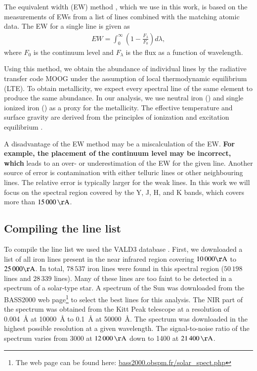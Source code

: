 \documentclass{aa}
\begin{document}
The equivalent width (EW) method
\citep[see e.g.][]{Sousa2008a,Mucciarelli2013,Bensby2014}, which we use
in this work, is based on the measurements of EWs from a list of lines
combined with the matching atomic data. The EW for a single line is
given as
\begin{align}
    \label{eq:EW}
    EW = \int_0^\infty \left(1 - \frac{F_\lambda}{F_0}\right) d\lambda,
\end{align}
where $F_0$ is the continuum level and $F_\lambda$ is the flux as a
function of wavelength.

Using this method, we obtain the abundance of individual lines by
the radiative transfer code MOOG \citep[][version 2013]{Sneden1973}
under the assumption of local thermodynamic equilibrium (LTE). To
obtain metallicity, we expect every spectral line of the same element
to produce the same abundance. In our analysis, we use neutral iron
() and single ionized iron () as a proxy for
the metallicity. The effective temperature and surface gravity are
derived from the principles of ionization and excitation equilibrium
\citep[see][]{Gray2006}.


A disadvantage of the EW method may be a miscalculation of the EW. \textbf{For
example, the placement of the continuum level may be incorrect, which}
leads to an over- or underestimation of the EW for the given line.
Another source of error is contamination with either telluric lines or
other neighbouring lines. The relative error is typically larger for the
weak lines. In this work we will focus on the spectral region covered by
the Y, J, H, and K bands, which covers more than $\SI{15000}{\AA}$.



\subsection{Compiling the line list}

To compile the line list we used the VALD3 database \citep{VALD1,VALD2}.
First, we downloaded a list of all iron lines present in the near
infrared region covering $10\,000\si{\AA}$ to $25\,000\si{\AA}$.
In total, $78\,537$ iron lines were found in this spectral region
($50\,198$  lines and $28\,339$  lines).
Many of these lines are too faint to be detected in a spectrum
of a solar-type star. A spectrum of the Sun was downloaded from
the BASS2000 web page\footnote{The web page can be found here:
\url{bass2000.obspm.fr/solar_spect.php}} to select the best lines
for this analysis. The NIR part of the spectrum was obtained from
the Kitt Peak telescope \citep{Hinkle1995} at a resolution of
\SI{0.004}{\angstrom} at \SI{10000}{\angstrom} to \SI{0.1}{\angstrom}
at \SI{50000}{\angstrom}. The spectrum was downloaded in the highest
possible resolution at a given wavelength. The signal-to-noise ratio
of the spectrum varies from 3000 at $\SI{12000}{\AA}$ down to 1400 at
$\SI{21400}{\AA}$.
\end{document}
